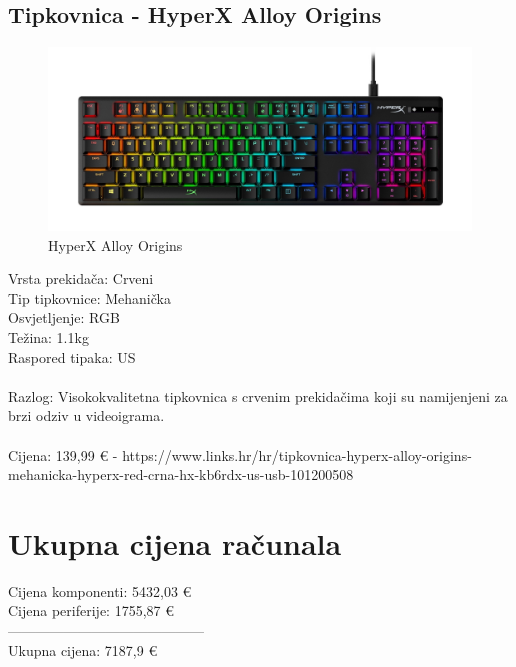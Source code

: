 \documentclass{report}
\begin{document}
\section{Tipkovnica - HyperX Alloy Origins}
\begin{figure}[H]
    \centering
    \includegraphics[scale=0.25]{Slike/tipkovnica.jpg}
    \caption{HyperX Alloy Origins}
    \label{fig:tipkovnica}
\end{figure}
Vrsta prekidača: Crveni\\Tip tipkovnice: Mehanička\\Osvjetljenje: RGB\\Težina: 1.1kg\\Raspored tipaka: US\\\\Razlog: Visokokvalitetna tipkovnica s crvenim prekidačima koji su namijenjeni za brzi odziv u videoigrama.\\\\Cijena: 139,99 € - https://www.links.hr/hr/tipkovnica-hyperx-alloy-origins-mehanicka-hyperx-red-crna-hx-kb6rdx-us-usb-101200508

\pagebreak

\chapter{Ukupna cijena računala}
Cijena komponenti: 5432,03 €\\Cijena periferije: 1755,87 €\\------------------------------------------\\Ukupna cijena: 7187,9 €
\end{document}
